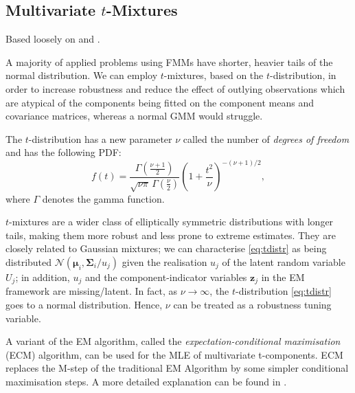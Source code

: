 \documentclass{article}\usepackage[]{graphicx}\usepackage[]{xcolor}
\theoremstyle{plain}
\theoremstyle{definition}
\theoremstyle{remark}
\newcommand{\boldz}{\mathbf{z}}
\newcommand{\boldmu}{\boldsymbol{\mu}}
\newcommand{\boldSigma}{\boldsymbol{\Sigma}}
\begin{document}
\subsection{Multivariate $t$-Mixtures}
Based loosely on \cite[Section 8.1]{annurev_FMMs} and \cite[Section 7.1]{FMMs_Book}. %

A majority of applied problems using FMMs have shorter, heavier tails of the normal distribution. We can employ $t$-mixtures, based on the $t$-distribution, in order to increase robustness and reduce the effect of outlying observations which are atypical of the components being fitted on the component means and covariance matrices, whereas a normal GMM would struggle.

The $t$-distribution has a new parameter $\nu$ called the number of \textit{degrees of freedom} and has the following PDF: 
\begin{equation} \label{eq:tdistr}
  f(t) = \frac{\Gamma (\frac{\nu + 1}{2})}{\sqrt{\nu \pi} \, \Gamma (\frac{\nu}{2})}\left(1 + \frac{t^2}{\nu}\right)^{-(\nu + 1) / 2},
\end{equation}
where $\Gamma$ denotes the gamma function.

$t$-mixtures are a wider class of elliptically symmetric distributions with longer tails, making them more robust and less prone to extreme estimates. They are closely related to Gaussian mixtures; we can characterise \eqref{eq:tdistr} as being distributed $\mathcal{N}(\boldmu_i, \boldSigma_i / u_j)$ given the realisation $u_j$ of the latent random variable $U_j$; in addition, $u_j$ and the component-indicator variables $\boldz_j$ in the EM framework are missing/latent. In fact, as $\nu \to \infty$, the $t$-distribution \eqref{eq:tdistr} goes to a normal distribution. Hence, $\nu$ can be treated as a robustness tuning variable.

A variant of the EM algorithm, called the \textit{expectation-conditional maximisation} (ECM) algorithm, can be used for the MLE of multivariate t-components. ECM replaces the M-step of the traditional EM Algorithm by some simpler conditional maximisation steps. A more detailed explanation can be found in \cite[Section 7.5]{FMMs_Book}.

\newpage
\end{document}
